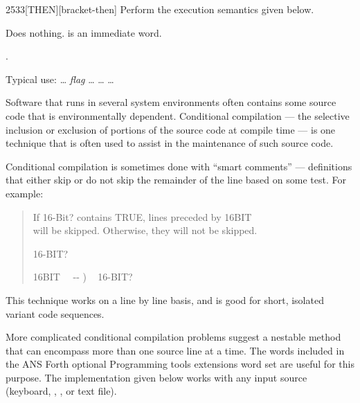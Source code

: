 \begin{worddef}{2533}{[THEN]}[bracket-then]
\compile
	Perform the execution semantics given below.

\execute
	\stack{}{}

	Does nothing. \word{[THEN]} is an immediate word.

\see {}.

	\begin{rationale} %
		Typical use:
			{\ldots} \emph{flag}
			\word[tools]{[IF]} {\ldots}
			\word[tools]{[ELSE]} {\ldots}
			\word[tools]{[THEN]} {\ldots}

		Software that runs in several system environments often
		contains some source code that is environmentally dependent.
		Conditional compilation --- the selective inclusion or
		exclusion of portions of the source code at compile time ---
		is one technique that is often used to assist in the
		maintenance of such source code.

		Conditional compilation is sometimes done with ``smart
		comments'' --- definitions that either skip or do not skip
		the remainder of the line based on some test. For example:

		\begin{quote}\ttfamily
			 If 16-Bit? contains TRUE, lines preceded by 16BIT\bs \\
			 will be skipped. Otherwise, they will not be skipped.

			 16-BIT?

			\word{:} 16BIT\bs~~ -{}- ) ~
				16-BIT?  ~
				 ~   ~  \\
			\word{;} 
		\end{quote}

		This technique works on a line by line basis, and is good for
		short, isolated variant code sequences.

		More complicated conditional compilation problems suggest a
		nestable method that can encompass more than one source line
		at a time. The words included in the ANS Forth optional
		Programming tools extensions word set are useful for this
		purpose. The implementation given below works with any input
		source (keyboard, , , or
		text file).


\end{rationale}
\end{worddef}
